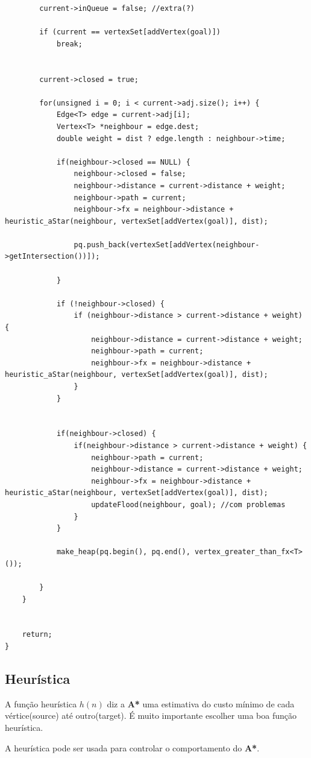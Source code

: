 \documentclass[a4paper]{article}
\begin{document}
\begin{lstlisting}
		current->inQueue = false; //extra(?)

		if (current == vertexSet[addVertex(goal)])
			break;


		current->closed = true;

		for(unsigned i = 0; i < current->adj.size(); i++) {
			Edge<T> edge = current->adj[i];
			Vertex<T> *neighbour = edge.dest;
			double weight = dist ? edge.length : neighbour->time;

			if(neighbour->closed == NULL) {
				neighbour->closed = false;
				neighbour->distance = current->distance + weight;
				neighbour->path = current;
				neighbour->fx = neighbour->distance + heuristic_aStar(neighbour, vertexSet[addVertex(goal)], dist);

				pq.push_back(vertexSet[addVertex(neighbour->getIntersection())]);

			}

			if (!neighbour->closed) {
				if (neighbour->distance > current->distance + weight) {
					neighbour->distance = current->distance + weight;
					neighbour->path = current;
					neighbour->fx = neighbour->distance + heuristic_aStar(neighbour, vertexSet[addVertex(goal)], dist);
				}
			}


			if(neighbour->closed) {
				if(neighbour->distance > current->distance + weight) {
					neighbour->path = current;
					neighbour->distance = current->distance + weight;
					neighbour->fx = neighbour->distance + heuristic_aStar(neighbour, vertexSet[addVertex(goal)], dist);
					updateFlood(neighbour, goal); //com problemas
				}
			}

			make_heap(pq.begin(), pq.end(), vertex_greater_than_fx<T>());

		}
	}


	return;
}

\end{lstlisting}


\subsection{Heurística}

A função heurística $h(n)$ diz a \textbf{A*} uma estimativa do custo mínimo de cada vértice(source) até outro(target). É muito importante escolher uma boa função heurística. 

A heurística pode ser usada para controlar o comportamento do \textbf{A*}.
\end{document}
